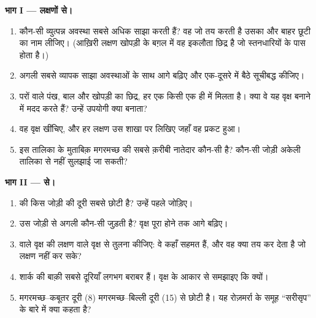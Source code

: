 \begin{problem}
\medskip
\noindent\textbf{भाग I --- लक्षणों से।}
\begin{enumerate}
  \item कौन-सी व्युत्पन्न अवस्था सबसे अधिक  साझा करती हैं? वह जो
         तय करती है उसका और बाहर छूटी  का नाम लीजिए। (आख़िरी
        लक्षण खोपड़ी के बग़ल में वह इकलौता छिद्र है जो स्तनधारियों के पास
        होता है।)
  \item अगली सबसे व्यापक साझा अवस्थाओं के साथ आगे बढ़िए और एक-दूसरे में
        बैठे  सूचीबद्ध कीजिए।
  \item परों वाले पंख, बाल और खोपड़ी का छिद्र, हर एक किसी एक ही  में
        मिलता है। क्या वे यह वृक्ष बनाने में मदद करते हैं? उन्हें
        उपयोगी क्या बनाता?
  \item वह वृक्ष खींचिए, और हर लक्षण उस शाखा पर लिखिए जहाँ वह प्रकट हुआ।
  \item इस तालिका के मुताबिक़ मगरमच्छ की सबसे क़रीबी नातेदार कौन-सी 
        है? कौन-सी जोड़ी अकेली तालिका से नहीं सुलझाई जा सकती?
\end{enumerate}

\medskip
\noindent\textbf{भाग II ---  से।}
\begin{enumerate}[resume]
  \item {} की किस जोड़ी की दूरी सबसे छोटी है? उन्हें पहले जोड़िए।
  \item उस जोड़ी से अगली कौन-सी  जुड़ती है? वृक्ष पूरा होने तक आगे
        बढ़िए।
  \item {} वाले वृक्ष की लक्षण वाले वृक्ष से तुलना कीजिए: वे कहाँ सहमत
        हैं, और  वह क्या तय कर देता है जो लक्षण नहीं कर सके?
  \item शार्क की बाक़ी सबसे दूरियाँ लगभग बराबर हैं। वृक्ष के आकार से
        समझाइए कि क्यों।
  \item मगरमच्छ--कबूतर दूरी (8) मगरमच्छ--बिल्ली दूरी (15) से छोटी है। यह
        रोज़मर्रा के समूह ``सरीसृप'' के बारे में क्या कहता है?
\end{enumerate}


\end{problem}
